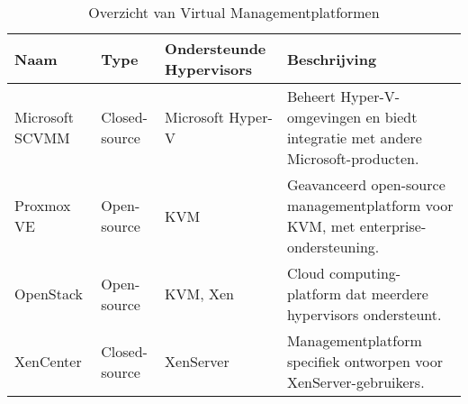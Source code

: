 \documentclass{article}
\begin{document}
\begin{table}[h]
    \centering
    \begin{tabular}{|l|l|l|>{\raggedright\arraybackslash}p{5cm}|} %
        \hline
        \textbf{Naam} & \textbf{Type} & \textbf{Ondersteunde Hypervisors} & \textbf{Beschrijving} \\
        \hline
        Microsoft SCVMM & Closed-source & Microsoft Hyper-V & Beheert Hyper-V-omgevingen en biedt integratie met andere Microsoft-producten. \\
        Proxmox VE & Open-source & KVM & Geavanceerd open-source managementplatform voor KVM, met enterprise-ondersteuning. \\
        OpenStack & Open-source & KVM, Xen & Cloud computing-platform dat meerdere hypervisors ondersteunt. \\
        XenCenter & Closed-source & XenServer & Managementplatform specifiek ontworpen voor XenServer-gebruikers. \\
        \hline
    \end{tabular}
    \caption{Overzicht van Virtual Managementplatformen}
    \label{tab:managementplatformen}
\end{table}
\end{document}
